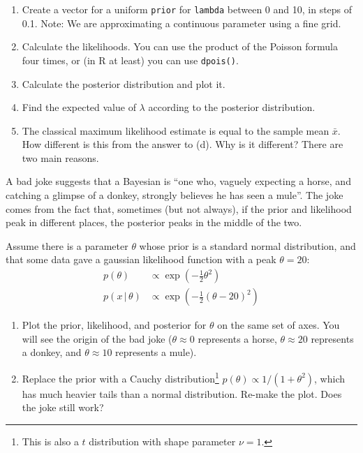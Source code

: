 \documentclass[12pt]{article}
\newcommand{\given}{\,|\,}
\begin{document}
\begin{Questions}
\begin{enumerate}
\item [(a)] Create a vector for a uniform {\tt prior}
for {\tt lambda} between 0 and 10, in steps of 0.1.
Note: We are approximating a continuous parameter using a fine grid.
\item [(b)] Calculate the likelihoods. You can use the product
of the Poisson formula four times, or (in R at least) you can
use \texttt{dpois()}.
\item [(c)] Calculate the posterior distribution and plot it.
\item [(d)] Find the expected value of $\lambda$ according to the
posterior distribution.
\item [(e)] The classical maximum likelihood estimate is equal
to the sample mean $\bar{x}$. How different is this from the answer
to (d). Why is it different? There are two main reasons.
\end{enumerate}





\item

A bad joke suggests that a Bayesian is ``one who,
vaguely expecting a horse, and catching a glimpse of a donkey, strongly believes he has seen a mule''. The joke comes from the fact that,
sometimes (but not always),
if the prior and likelihood peak in different places, the
posterior peaks in the middle of the two.

Assume there is a parameter $\theta$ whose prior is a standard normal
distribution, and that some data gave a gaussian likelihood function
with a peak $\theta=20$:
\begin{align}
p(\theta)   &\propto \exp \left(-\frac{1}{2}\theta^2\right) \\
p(x \given \theta) &\propto \exp \left(-\frac{1}{2}(\theta - 20)^2\right)
\end{align}

\begin{enumerate}
\item [(a)] Plot the prior, likelihood, and posterior for $\theta$ on the
                same set of axes. You will see the origin of the bad joke
                ($\theta\approx 0$ represents a horse, $\theta\approx 20$
                 represents a donkey, and
                 $\theta \approx 10$ represents a mule).
\item [(b)] Replace the prior with a Cauchy distribution\footnote{This is also
a $t$ distribution with shape parameter $\nu=1$.}
                $p(\theta) \propto 1/(1+\theta^2)$, which has much heavier tails
                than a normal distribution. Re-make the plot. Does
                the joke still work?


\end{enumerate}
\end{Questions}
\end{document}
